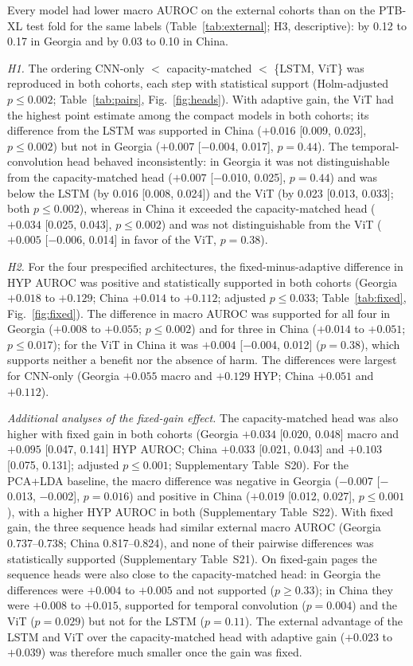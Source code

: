 \documentclass{wlscirep}
\begin{document}
Every model had lower macro AUROC on the external cohorts than on the PTB-XL test fold for the same labels (Table~\ref{tab:external}; H3, descriptive): by 0.12 to 0.17 in Georgia and by 0.03 to 0.10 in China.

\emph{H1.} The ordering CNN-only $<$ capacity-matched $<$ \{LSTM, ViT\} was reproduced in both cohorts, each step with statistical support (Holm-adjusted $p\le0.002$; Table~\ref{tab:pairs}, Fig.~\ref{fig:heads}). With adaptive gain, the ViT had the highest point estimate among the compact models in both cohorts; its difference from the LSTM was supported in China ($+0.016$ [0.009, 0.023], $p\le0.002$) but not in Georgia ($+0.007$ [$-$0.004, 0.017], $p=0.44$). The temporal-convolution head behaved inconsistently: in Georgia it was not distinguishable from the capacity-matched head ($+0.007$ [$-$0.010, 0.025], $p=0.44$) and was below the LSTM (by 0.016 [0.008, 0.024]) and the ViT (by 0.023 [0.013, 0.033]; both $p\le0.002$), whereas in China it exceeded the capacity-matched head ($+0.034$ [0.025, 0.043], $p\le0.002$) and was not distinguishable from the ViT ($+0.005$ [$-$0.006, 0.014] in favor of the ViT, $p=0.38$).

\emph{H2.} For the four prespecified architectures, the fixed-minus-adaptive difference in HYP AUROC was positive and statistically supported in both cohorts (Georgia $+0.018$ to $+0.129$; China $+0.014$ to $+0.112$; adjusted $p\le0.033$; Table~\ref{tab:fixed}, Fig.~\ref{fig:fixed}). The difference in macro AUROC was supported for all four in Georgia ($+0.008$ to $+0.055$; $p\le0.002$) and for three in China ($+0.014$ to $+0.051$; $p\le0.017$); for the ViT in China it was $+0.004$ [$-$0.004, 0.012] ($p=0.38$), which supports neither a benefit nor the absence of harm. The differences were largest for CNN-only (Georgia $+0.055$ macro and $+0.129$ HYP; China $+0.051$ and $+0.112$).

\emph{Additional analyses of the fixed-gain effect.} The capacity-matched head was also higher with fixed gain in both cohorts (Georgia $+0.034$ [0.020, 0.048] macro and $+0.095$ [0.047, 0.141] HYP AUROC; China $+0.033$ [0.021, 0.043] and $+0.103$ [0.075, 0.131]; adjusted $p\le0.001$; Supplementary Table~S20). For the PCA+LDA baseline, the macro difference was negative in Georgia ($-0.007$ [$-$0.013, $-$0.002], $p=0.016$) and positive in China ($+0.019$ [0.012, 0.027], $p\le0.001$), with a higher HYP AUROC in both (Supplementary Table~S22). With fixed gain, the three sequence heads had similar external macro AUROC (Georgia 0.737--0.738; China 0.817--0.824), and none of their pairwise differences was statistically supported (Supplementary Table~S21). On fixed-gain pages the sequence heads were also close to the capacity-matched head: in Georgia the differences were $+0.004$ to $+0.005$ and not supported ($p\ge0.33$); in China they were $+0.008$ to $+0.015$, supported for temporal convolution ($p=0.004$) and the ViT ($p=0.029$) but not for the LSTM ($p=0.11$). The external advantage of the LSTM and ViT over the capacity-matched head with adaptive gain ($+0.023$ to $+0.039$) was therefore much smaller once the gain was fixed.
\end{document}
